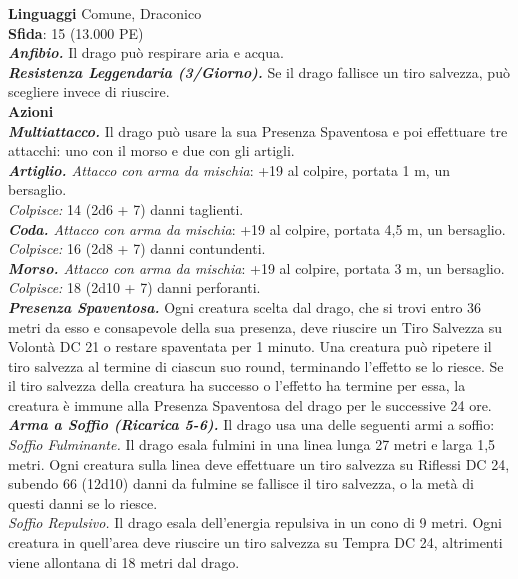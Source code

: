 \begin{multicols}{2}
\textbf{Linguaggi} Comune, Draconico\\
\textbf{Sfida}: 15 (13.000 PE)\smallskip\\
\emph{\textbf{Anfibio.}} Il drago può respirare aria e acqua.\\
\emph{\textbf{Resistenza Leggendaria (3/Giorno).}} Se il drago fallisce un tiro salvezza, può scegliere invece di riuscire.\\
\smallskip\textbf{Azioni}\\
\emph{\textbf{Multiattacco.}} Il drago può usare la sua Presenza Spaventosa e poi effettuare tre attacchi: uno con il morso e due con gli artigli.\\
\emph{\textbf{Artiglio.} Attacco con arma da mischia}: +19 al colpire, portata 1 m, un bersaglio.\\
\emph{Colpisce:} 14 (2d6 + 7) danni taglienti.\\
\emph{\textbf{Coda.} Attacco con arma da mischia}: +19 al colpire, portata 4,5 m, un bersaglio.\\
\emph{Colpisce:} 16 (2d8 + 7) danni contundenti.\\
\emph{\textbf{Morso.} Attacco con arma da mischia}: +19 al colpire, portata 3 m, un bersaglio.\\
\emph{Colpisce:} 18 (2d10 + 7) danni perforanti.\\
\emph{\textbf{Presenza Spaventosa.}} Ogni creatura scelta dal drago, che si trovi entro 36 metri da esso e consapevole della sua presenza, deve riuscire un Tiro Salvezza su Volontà DC  21 o restare spaventata per 1 minuto. Una creatura può ripetere il tiro salvezza al termine di ciascun suo round, terminando l'effetto se lo riesce. Se il tiro salvezza della creatura ha successo o l'effetto ha termine per essa, la creatura è immune alla Presenza Spaventosa del drago per le successive 24 ore.\\
\emph{\textbf{Arma a Soffio (Ricarica 5-6).}} Il drago usa una delle seguenti armi a soffio:\\
\emph{Soffio Fulminante.} Il drago esala fulmini in una linea lunga 27 metri e larga 1,5 metri. Ogni creatura sulla linea deve effettuare un tiro salvezza su Riflessi DC  24, subendo 66 (12d10) danni da fulmine se fallisce il tiro salvezza, o la metà di questi danni se lo riesce.\\
\emph{Soffio Repulsivo.} Il drago esala dell'energia repulsiva in un cono di 9 metri. Ogni creatura in quell'area deve riuscire un tiro salvezza su Tempra DC  24, altrimenti viene allontana di 18 metri dal drago.\\


\end{multicols}
